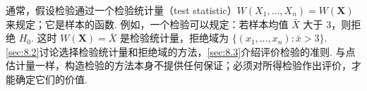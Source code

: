 通常，假设检验通过一个检验统计量（test statistic）$W(X_1,\ldots,X_n)=W(\boldsymbol X)$ 来规定；它是样本的函数. 例如，一个检验可以规定：若样本均值 $\bar X$ 大于 $3$，则拒绝 $H_0$. 这时 $W(\boldsymbol X)=\bar X$ 是检验统计量，拒绝域为 $\{(x_1,\ldots,x_n):\bar x>3\}$. \autoref{sec:8.2}讨论选择检验统计量和拒绝域的方法，\autoref{sec:8.3}介绍评价检验的准则. 与点估计量一样，构造检验的方法本身不提供任何保证；必须对所得检验作出评价，才能确定它们的价值.
